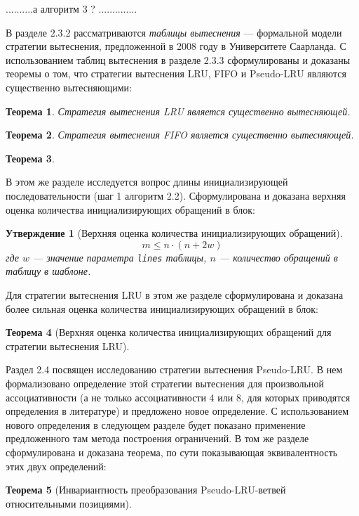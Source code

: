 \documentclass[14pt,autoref,href
,facsimile
]{disser}
\newtheorem{utv}{Утверждение}
\newtheorem{theorem}{Теорема}
\newcommand{\LRU}{LRU\xspace}
\newcommand{\PseudoLRU}{Pseudo-LRU\xspace}
\begin{document}
..........а алгоритм 3 ? ..............

В разделе 2.3.2 рассматриваются \emph{таблицы вытеснения} --- формальной модели стратегии вытеснения, предложенной в 2008 году в Университете Саарланда. С использованием таблиц вытеснения в разделе 2.3.3 сформулированы и доказаны теоремы о том, что стратегии вытеснения LRU, FIFO и Pseudo-LRU являются существенно вытесняющими:
\begin{theorem}\label{thm:LRU_essential}
Стратегия вытеснения LRU является существенно вытесняющей.
\end{theorem}

\begin{theorem}
  Стратегия вытеснения FIFO является существенно вытесняющей.
\end{theorem}

\begin{theorem}\label{thm:PseudoLRU_essential} \PseudoLRUEssential \end{theorem}

В этом же разделе исследуется вопрос длины инициализирующей последовательности (шаг 1 алгоритм 2.2). Сформулирована и доказана верхняя оценка количества инициализирующих обращений в блок:
\begin{utv}[Верхняя оценка количества инициализирующих обращений]
$$m \leqslant n \cdot (n + 2w)$$
где $w$ --- значение параметра \texttt{lines} таблицы, $n$ --- количество обращений в таблицу в шаблоне.
\end{utv}

Для стратегии вытеснения LRU в этом же разделе сформулирована и доказана более сильная оценка количества инициализирующих обращений в блок:
\begin{theorem}[Верхняя оценка количества инициализирующих обращений для
стратегии вытеснения \LRU]\label{thm_mirror_lenth_lru} \UpperBoundLRUMirror
\end{theorem}

Раздел 2.4 посвящен исследованию стратегии вытеснения Pseudo-LRU. В нем формализовано определение этой стратегии вытеснения для произвольной ассоциативности (а не только ассоциативности 4 или 8, для которых приводятся определения в литературе) и предложено новое определение. С использованием нового определения в следующем разделе будет показано применение предложенного там метода построения ограничений. В том же разделе сформулирована и доказана теорема, по сути показывающая эквивалентность этих двух определений:
\begin{theorem}[Инвариантность преобразования \PseudoLRU-ветвей относительными
позициями]\label{thm_pseudoLRU_invariant} \PseudoLRUInvariant
\end{theorem}
\end{document}
